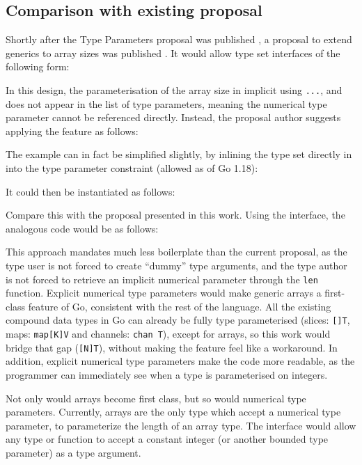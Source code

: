 \subsection{Comparison with existing proposal}

Shortly after the Type Parameters proposal was published
\autocite{genericsProposal}, a proposal to extend generics to array sizes was
published \autocite{goArrayProposal}. It would allow type set interfaces of the
following form:


In this design, the parameterisation of the array size in implicit using
\texttt{...}, and does not appear in the list of type parameters, meaning the
numerical type parameter cannot be referenced directly. Instead, the proposal
author suggests applying the feature as follows:


The example can in fact be simplified slightly, by inlining the type set
directly in into the type parameter constraint (allowed as of Go 1.18):


It could then be instantiated as follows:


Compare this with the proposal presented in this work. Using the 
interface, the analogous code would be as follows:


This approach mandates much less boilerplate than the current proposal, as the
type user is not forced to create ``dummy'' type arguments, and the type author
is not forced to retrieve an implicit numerical parameter through the
\texttt{len} function. Explicit numerical type parameters would make generic
arrays a first-class feature of Go, consistent with the rest of the language.
All the existing compound data types in Go can already be fully type
parameterised (slices: \texttt{[]T}, maps: \texttt{map[K]V} and channels:
\texttt{chan T}), except for arrays, so this work would bridge that gap
(\texttt{[N]T}), without making the feature feel like a workaround. In addition,
explicit numerical type parameters make the code more readable, as the
programmer can immediately see when a type is parameterised on integers.

Not only would arrays become first class, but so would numerical type
parameters. Currently, arrays are the only type which accept a numerical type
parameter, to parameterize the length of an array type. The  interface
would allow any type or function to accept a constant integer (or another
 bounded type parameter) as a type argument.

